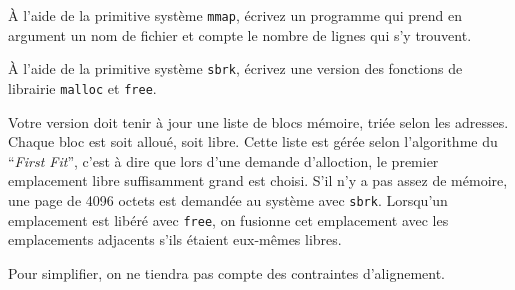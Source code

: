 \question

À l'aide de la primitive système \texttt {mmap}, écrivez un programme
qui prend en argument un nom de fichier et compte le nombre de lignes
qui s'y trouvent.


\question

\`A l'aide de la primitive système {\tt sbrk}, écrivez une version
des fonctions de librairie {\tt malloc} et {\tt free}.

Votre version doit tenir à jour une liste de blocs mémoire, triée
selon les adresses. Chaque bloc
est soit alloué, soit libre. Cette liste est gérée selon l'algorithme
du ``{\em First Fit\/}'', c'est à dire que lors d'une demande
d'alloction, le premier emplacement libre suffisamment grand est
choisi. S'il n'y a pas assez de mémoire, une page de 4096 octets
est demandée au système avec {\tt sbrk}. Lorsqu'un emplacement est
libéré avec {\tt free}, on fusionne cet emplacement avec les
emplacements adjacents s'ils étaient eux-mêmes libres.

Pour simplifier, on ne tiendra pas compte des contraintes
d'alignement.
